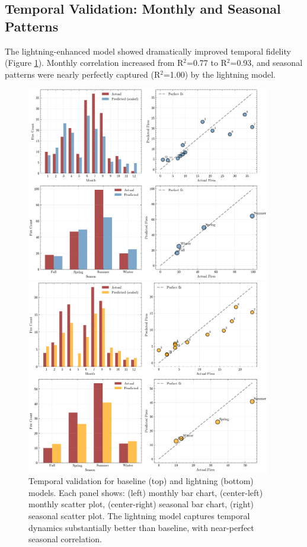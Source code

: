 \documentclass[11pt,a4paper]{article}
\begin{document}
\subsection{Temporal Validation: Monthly and Seasonal Patterns}

The lightning-enhanced model showed dramatically improved temporal fidelity (Figure \ref{fig:temporal_validation}). Monthly correlation increased from R$^2$=0.77 to R$^2$=0.93, and seasonal patterns were nearly perfectly captured (R$^2$=1.00) by the lightning model.

\begin{figure}[H]
\centering
\includegraphics[width=0.95\textwidth]{../output/figures/validation_temporal_baseline.png}

\vspace{0.5cm}

\includegraphics[width=0.95\textwidth]{../output/figures/validation_temporal_lightning.png}
\caption{Temporal validation for baseline (top) and lightning (bottom) models. Each panel shows: (left) monthly bar chart, (center-left) monthly scatter plot, (center-right) seasonal bar chart, (right) seasonal scatter plot. The lightning model captures temporal dynamics substantially better than baseline, with near-perfect seasonal correlation.}
\label{fig:temporal_validation}
\end{figure}
\end{document}
